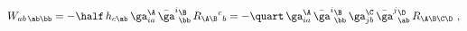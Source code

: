 \begin{equation} \label{W}
  W_{ab\,\ab\bb} = - \half\, h_{c\ab}\, \ga_{ia}^\A\, \bar{\ga}^i
  {}_\bb^\B\, R_{\A\B}{}^c{}_b = - \quart\, \ga^\A_{ia}\, \bar{\ga}^i
  {}^\B_\bb\, \ga^\C_{jb}\, \bar{\ga}^j{}^\D_\ab\, R_{\A\B\C\D}\ ,
 \end{equation}


